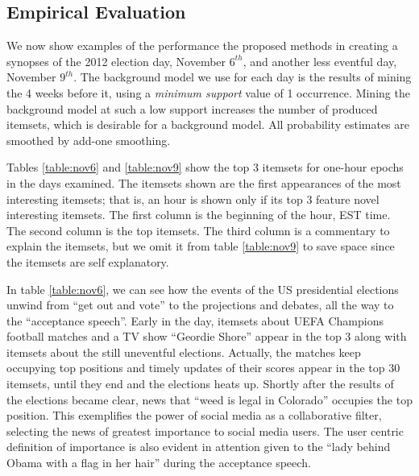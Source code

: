 \documentclass[letterpaper,12pt,titlepage,oneside,final]{book}
\begin{document}
\subsection{Empirical Evaluation}
\label{sec:empirical}
We now show examples of the performance the proposed methods in creating
a synopses of the 2012 election day, November $6^{th}$, and another less
eventful day, November $9^{th}$.
The background model we use for each day is the results of mining the 4 weeks
before it, using a \emph{minimum support} value of 1 occurrence.
Mining the background model at such a low support increases the number of
produced itemsets, which is desirable for a background model.
All probability estimates are smoothed by add-one smoothing. 

Tables \ref{table:nov6} and \ref{table:nov9}  show the top 3 itemsets for
one-hour epochs in the days examined.
The itemsets shown are the first appearances of the most interesting itemsets;
that is, an hour is shown only if its top 3 feature novel interesting itemsets. The first column is the beginning of the hour, EST time.
The second column is the top itemsets.
The third column is a commentary to explain the itemsets,
but we omit it from table \ref{table:nov9} to save space since the itemsets are self explanatory.

In table \ref{table:nov6}, we can see how the events of the US presidential
elections  unwind from ``get out and vote'' to the projections and debates,
all the way to the ``acceptance speech''.
Early in the day, itemsets about UEFA Champions football matches and a TV show
``Geordie Shore'' appear in the top 3 along with itemsets about the still
uneventful elections.
Actually, the matches keep occupying top positions and timely updates of their
scores appear in the top 30 itemsets, until they end and the elections
heats up.
Shortly after the results of the elections became clear, news that
``weed is legal in Colorado'' occupies the top position.
This exemplifies the power of social media as a collaborative filter,
selecting the news of greatest importance to social media users.
The user centric definition of importance is also evident in attention
given to the ``lady behind Obama  with a flag in her hair'' during the
acceptance speech. 
\end{document}
